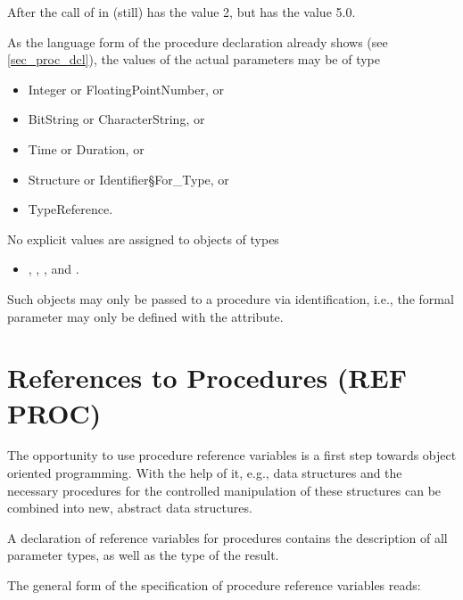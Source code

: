 After the call of  in   (still) has the value 2,
 but  has the
value 5.0.

As the language form of the procedure declaration already shows (see
\ref{sec_proc_dcl}), the values of the actual parameters may be of type
\begin{itemize}
\item Integer or FloatingPointNumber, or
\item BitString or CharacterString, or
\item Time or Duration, or
\item Structure or Identifier\S For\_Type, or
\item TypeReference.
\end{itemize}
No explicit values are assigned to objects of types
\begin{itemize}
\item {}, , ,  and .
\end{itemize}
Such objects may only be passed to a procedure via identification, i.e.,
the formal parameter may only be defined with the  attribute.

\section{References to Procedures (REF PROC)}  %
\label{sec_ref_proc}

The opportunity to use procedure reference variables is a first step
towards object oriented programming. With the help of it, e.g., data
structures and the necessary procedures for the controlled manipulation of
these structures can be combined into new, abstract data structures.

A declaration of reference variables for procedures contains the
description of all parameter types, as well as the type of the result.

\begin{grammarframe}
\end{grammarframe}

The general form of the specification of procedure reference variables
reads:

\begin{grammarframe}
\end{grammarframe}

